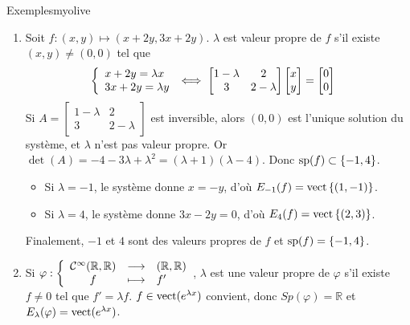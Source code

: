     \begin{omed}{Exemples}{myolive}
        \begin{enumerate}[label=\arabic*.]
            \item Soit $f : (x,y) \mapsto (x + 2y, 3x + 2y)$. $\lambda$ est valeur propre de $f$ s’il existe $(x,y) \neq (0,0)$ tel que
            \begin{align*}
                \et{x + 2y = \lambda x}{3x + 2y = \lambda y}
                &\iff \begin{bmatrix}
                    1- \lambda & 2 \\
                    3 & 2 - \lambda
                \end{bmatrix} \begin{bmatrix}
                    x \\
                    y
                \end{bmatrix} = \begin{bmatrix}
                    0 \\
                    0
                \end{bmatrix} 
            \end{align*}
            Si $A = \begin{bmatrix}
                1- \lambda & 2 \\
                3 & 2 - \lambda
            \end{bmatrix}$ est inversible, alors $(0,0)$ est l’unique solution du système, et $\lambda$ n’est pas valeur propre. Or $\det(A) = -4 -3\lambda + \lambda^2 = (\lambda + 1)(\lambda - 4)$. Donc $\sp(f) \subset \left\{-1, 4\right\}$.
            \begin{itemize}
                \item Si $\lambda = -1$, le système donne $x = -y$, d’où $E_{-1}(f) = \vect\left\{(1,-1)\right\}$.
                \item Si $\lambda = 4$, le système donne $3x - 2y = 0$, d’où $E_{4}(f) = \vect\left\{(2,3)\right\}$.
            \end{itemize}
            Finalement, $-1$ et $4$ sont des valeurs propres de $f$ et $\sp(f) = \left\{-1,4\right\}$.
            \item Si $\fonction{\varphi}{\mathcal{C}^{\infty}(\mathbb{R},\mathbb{R})}{(\mathbb{R},\mathbb{R})}{f}{f'}$, $\lambda$ est une valeur propre de $\varphi$ s’il existe $f \neq 0$ tel que $f' = \lambda f$. $f \in \vect(e^{\lambda x})$ convient, donc $Sp(\varphi) = \mathbb{R}$ et $E_{\lambda}(\varphi) = \vect(e^{\lambda x})$.
        \end{enumerate}
    \end{omed}

